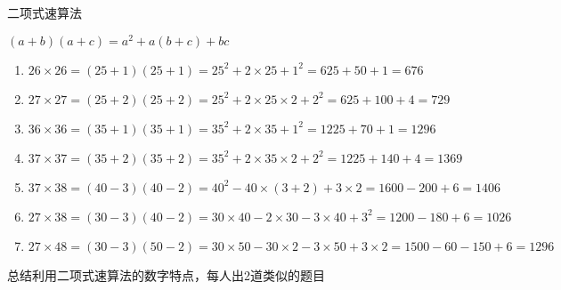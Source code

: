 \documentclass[aspectratio=169]{ctexbeamer} %
\date{\today}
\begin{document}
\begin{frame}[t]{二项式速算法}
\begin{spacing}{1.2}
\normalsize
$(a+b)(a+c)=a^2 + a(b+c) +bc$
\begin{enumerate}[label={\arabic*.}]
\item $26 \times 26 = (25+1)(25+1) = 25^2 + 2 \times 25 + 1^2 = 625 + 50 + 1 = 676$
\item $27 \times 27 = (25+2)(25+2) = 25^2 + 2 \times 25 \times 2 + 2^2 = 625 + 100 + 4 = 729$
\item $36 \times 36 = (35+1)(35+1) = 35^2 + 2 \times 35 + 1^2 = 1225 + 70 + 1 = 1296$
\item $37 \times 37 = (35+2)(35+2) = 35^2 + 2 \times 35 \times 2 + 2^2 = 1225 + 140 + 4 = 1369$
\item $37 \times 38 = (40-3)(40-2) = 40^2 - 40 \times (3 + 2) + 3 \times 2 = 1600 - 200 + 6 = 1406$
\item $27 \times 38 = (30-3)(40-2) = 30 \times 40 - 2 \times 30 - 3 \times 40 + 3^2 = 1200 - 180 + 6 = 1026$
\item $27 \times 48 = (30-3)(50-2) = 30 \times 50 - 30 \times 2 - 3 \times 50 + 3 \times 2 = 1500 - 60 - 150 + 6 = 1296$

\end{enumerate}
\alert{总结利用二项式速算法的数字特点，每人出2道类似的题目} \\
\end{spacing}
\end{frame}
\end{document}
